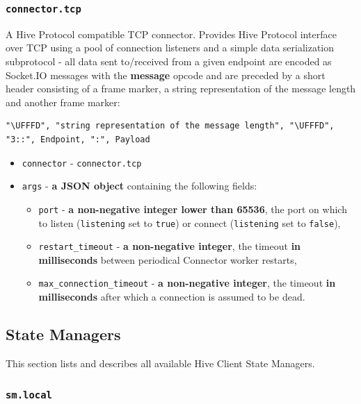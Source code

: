 \documentclass[a4paper]{article}
\begin{document}
\subsubsection{\texttt{connector.tcp}}
\label{sec-9-4-3}

A Hive Protocol compatible TCP connector. Provides Hive Protocol interface over TCP using a pool of connection listeners and a simple data serialization subprotocol - all data sent to/received from a given endpoint are encoded as Socket.IO messages with the \textbf{message} opcode and are preceded by a short header consisting of a frame marker, a string representation of the message length and another frame marker:


\begin{verbatim}
"\UFFFD", "string representation of the message length", "\UFFFD", "3::", Endpoint, ":", Payload
\end{verbatim}





\begin{itemize}
\item \texttt{connector} - \texttt{connector.tcp}
\item \texttt{args} - \textbf{a JSON object} containing the following fields:
\begin{itemize}
\item \texttt{port} - \textbf{a non-negative integer lower than 65536}, the port on which to listen (\texttt{listening} set to \texttt{true}) or connect (\texttt{listening} set to \texttt{false}),
\item \texttt{restart\_timeout} - \textbf{a non-negative integer}, the timeout \textbf{in milliseconds} between periodical Connector worker restarts,
\item \texttt{max\_connection\_timeout} - \textbf{a non-negative integer}, the timeout \textbf{in milliseconds} after which a connection is assumed to be dead.
\end{itemize}
\end{itemize}
\subsection{State Managers}
\label{sec-9-5}
\label{ref-state_managers}

This section lists and describes all available Hive Client State Managers.
\subsubsection{\texttt{sm.local}}
\label{sec-9-5-1}
\end{document}
